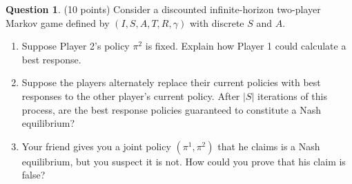 \documentclass{article}
\theoremstyle{definition}
\newtheorem{question}[thm]{Question}
\begin{document}
\clearpage


\begin{question}(10 points)
    Consider a discounted infinite-horizon two-player Markov game defined by $(I, S, A, T, R, \gamma)$ with discrete $S$ and $A$.

    \begin{enumerate}[label=\alph*)]
        \item Suppose Player 2's policy $\pi^2$ is fixed. Explain how Player 1 could calculate a best response.

        \item Suppose the players alternately replace their current policies with best responses to the other player's current policy. After $|S|$ iterations of this process, are the best response policies guaranteed to constitute a Nash equilibrium?

        \item Your friend gives you a joint policy $(\pi^1,\pi^2)$ that he claims is a Nash equilibrium, but you suspect it is not. How could you prove that his claim is false?
    \end{enumerate}
\end{question}
\end{document}
